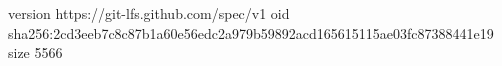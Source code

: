 version https://git-lfs.github.com/spec/v1
oid sha256:2cd3eeb7c8c87b1a60e56edc2a979b59892acd165615115ae03fc87388441e19
size 5566
